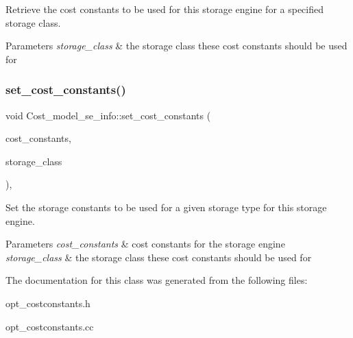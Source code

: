 Retrieve the cost constants to be used for this storage engine for a specified storage class.


\begin{DoxyParams}{Parameters}
{\em storage\+\_\+class} & the storage class these cost constants should be used for \\
\hline
\end{DoxyParams}
\mbox{\label{classCost__model__se__info_a9fe09e562399a9f942de3dfdbc46eb25}} 
\subsubsection{\texorpdfstring{set\+\_\+cost\+\_\+constants()}{set\_cost\_constants()}}
{\footnotesize\ttfamily void Cost\+\_\+model\+\_\+se\+\_\+info\+::set\+\_\+cost\+\_\+constants (\begin{DoxyParamCaption}\item[{\mbox{\hyperlink{classSE__cost__constants}{S\+E\+\_\+cost\+\_\+constants}} $\ast$}]{cost\+\_\+constants,  }\item[{unsigned int}]{storage\+\_\+class }\end{DoxyParamCaption})\hspace{0.3cm}{\ttfamily [inline]}, {\ttfamily [protected]}}

Set the storage constants to be used for a given storage type for this storage engine.


\begin{DoxyParams}{Parameters}
{\em cost\+\_\+constants} & cost constants for the storage engine \\
\hline
{\em storage\+\_\+class} & the storage class these cost constants should be used for \\
\hline
\end{DoxyParams}


The documentation for this class was generated from the following files\+:\begin{DoxyCompactItemize}
\item 
opt\+\_\+costconstants.\+h\item 
opt\+\_\+costconstants.\+cc\end{DoxyCompactItemize}
